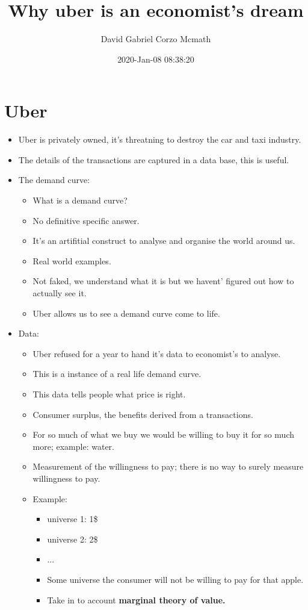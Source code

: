 \documentclass{article}
\title{Why uber is an economist's dream}
\author{David Gabriel Corzo Mcmath}
\date{2020-Jan-08 08:38:20}
\begin{document}
\maketitle

\section{Uber}
\begin{itemize}
    \item Uber is privately owned, it's threatning to destroy the car and taxi industry.
    \item The details of the transactions are captured in a data base, this is useful.
    \item The demand curve: 
        \begin{itemize}
            \item What is a demand curve? 
            \item No definitive specific answer.
            \item It's an artifitial construct to analyse and organise the world around us.
            \item Real world examples.
            \item Not faked, we understand what it is but we havent' figured out how to actually see it.
            \item Uber allows us to see a demand curve come to life.
        \end{itemize}
    
    \item Data:
        \begin{itemize}
            \item Uber refused for a year to hand it's data to economist's to analyse.
            \item This is a instance of a real life demand curve.
            \item This data tells people what price is right.
            \item Consumer surplus, the benefits derived from a transactions.
            \item For so much of what we buy we would be willing to buy it for so much more; example: water.
            \item Measurement of the willingness to pay; there is no way to surely measure willingness to pay.
            \item Example:
                \begin{itemize}
                    \item universe 1: 1\$
                    \item universe 2: 2\$
                    \item ... 
                    \item Some universe the consumer will not be willing to pay for that apple.
                    \item Take in to account \textbf{marginal theory of value.}
                \end{itemize}
            

\end{itemize}
\end{itemize}
\end{document}
